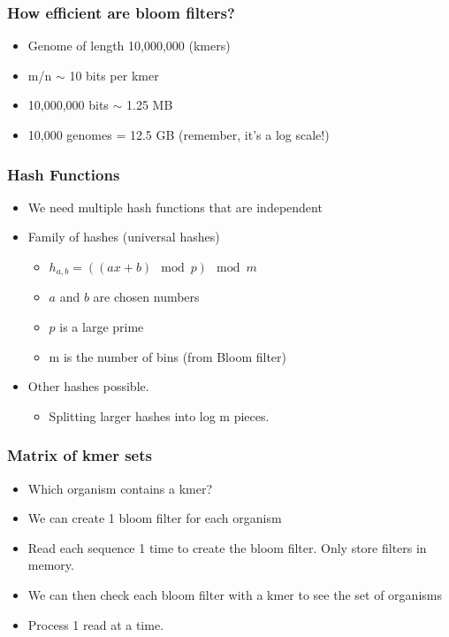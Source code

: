 \documentclass[10pt]{article}
\begin{document}
\subsubsection*{How efficient are bloom filters?}
\begin{itemize}
    \item Genome of length 10,000,000 (kmers)
    \item m/n $\sim$ 10 bits per kmer
    \item 10,000,000 bits $\sim$ 1.25 MB
    \item 10,000 genomes = 12.5 GB (remember, it's a log scale!)
\end{itemize}

\subsubsection*{Hash Functions}
\begin{itemize}
    \item We need multiple hash functions that are independent
    \item Family of hashes (universal hashes)
    \begin{itemize}
        \item $h_{a, b} = ((ax + b) \mod p) \mod m$
        \item $a$ and $b$ are chosen numbers
        \item $p$ is a large prime
        \item m is the number of bins (from Bloom filter)
    \end{itemize}
    \item Other hashes possible.
    \begin{itemize}
        \item Splitting larger hashes into log m pieces.
    \end{itemize}
\end{itemize}

\subsubsection*{Matrix of kmer sets}
\begin{itemize}
    \item Which organism contains a kmer?
    \item We can create 1 bloom filter for each organism
    \item Read each sequence 1 time to create the bloom filter.  Only store filters in memory.
    \item We can then check each bloom filter with a kmer to see the set of organisms
    \item Process 1 read at a time.
\end{itemize}
\end{document}
